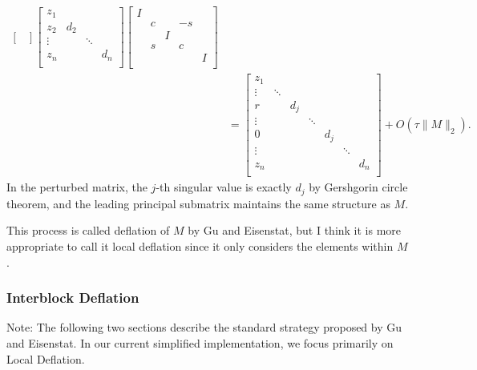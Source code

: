 \documentclass[12pt]{article}
\begin{document}
\begin{enumerate}
\[\begin{aligned}
\begin{bmatrix}
        \end{bmatrix}
        \begin{bmatrix}
            z_1 \\
            z_2 & d_2 \\
            \vdots & & \ddots \\
            z_n & & & d_n \\
        \end{bmatrix}
        \begin{bmatrix}
            I & & & & \\
            & c & & -s & \\
            & & I & & \\
            & s & & c & \\
            & & & & I \\
        \end{bmatrix}\\
        &= \begin{bmatrix}
            z_1 \\
            \vdots & \ddots \\
            r & & d_j \\
            \vdots & & & \ddots \\
            0 & & & & d_j \\
            \vdots & & & & & \ddots \\
            z_n & & & & & & d_n \\
        \end{bmatrix} + O(\tau \|M\|_2).
        \end{aligned}
    \]
    In the perturbed matrix, the \(j\)-th singular value is exactly \(d_j\) by Gershgorin circle theorem, and the leading principal submatrix maintains the same structure as \(M\).
\end{enumerate}

This process is called deflation of \(M\) by Gu and Eisenstat, but I think it is more appropriate to call it local deflation since it only considers the elements within \(M\).

\subsubsection{Interblock Deflation}

Note: The following two sections describe the standard strategy proposed by Gu and Eisenstat. In our current simplified implementation, we focus primarily on Local Deflation.
\end{document}
